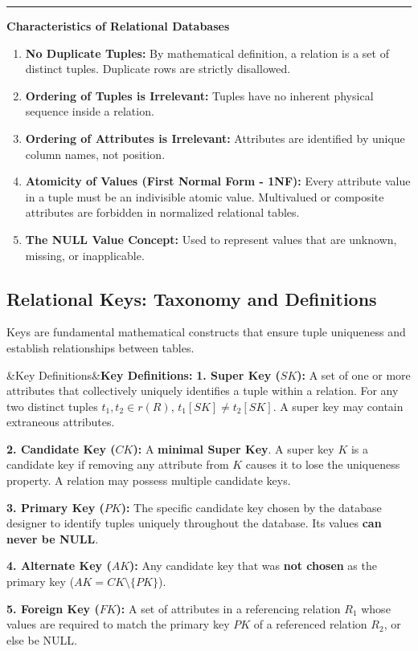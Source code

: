 \documentclass[11pt,a4paper]{article}
\newcommand{\concept}[1]{%
  \vspace{3pt}\noindent\textcolor{AnthGreen}{\rule{3.5pt}{10pt}}\enspace
  \textbf{\sffamily\color{AnthDark}#1}\par\vspace{2pt}%
}
\newenvironment{Def}[1][]{\begin{tcolorbox}[defbox]\ifx&#1&\else\textbf{\color{AnthOrange}#1:}\enspace\fi}{\end{tcolorbox}}
\begin{document}
\concept{Characteristics of Relational Databases}
\begin{enumerate}
  \item \textbf{No Duplicate Tuples:} By mathematical definition, a relation is a set of distinct tuples. Duplicate rows are strictly disallowed.
  \item \textbf{Ordering of Tuples is Irrelevant:} Tuples have no inherent physical sequence inside a relation.
  \item \textbf{Ordering of Attributes is Irrelevant:} Attributes are identified by unique column names, not position.
  \item \textbf{Atomicity of Values (First Normal Form - 1NF):} Every attribute value in a tuple must be an indivisible atomic value. Multivalued or composite attributes are forbidden in normalized relational tables.
  \item \textbf{The NULL Value Concept:} Used to represent values that are unknown, missing, or inapplicable.
\end{enumerate}

\subsection{Relational Keys: Taxonomy and Definitions}

Keys are fundamental mathematical constructs that ensure tuple uniqueness and establish relationships between tables.

\begin{Def}[Key Definitions]
\textbf{1. Super Key ($SK$):}
A set of one or more attributes that collectively uniquely identifies a tuple within a relation. For any two distinct tuples $t_1, t_2 \in r(R)$, $t_1[SK] \neq t_2[SK]$. A super key may contain extraneous attributes.

\textbf{2. Candidate Key ($CK$):}
A \textbf{minimal Super Key}. A super key $K$ is a candidate key if removing any attribute from $K$ causes it to lose the uniqueness property. A relation may possess multiple candidate keys.

\textbf{3. Primary Key ($PK$):}
The specific candidate key chosen by the database designer to identify tuples uniquely throughout the database. Its values \textbf{can never be NULL}.

\textbf{4. Alternate Key ($AK$):}
Any candidate key that was \textbf{not chosen} as the primary key ($AK = CK \setminus \{PK\}$).

\textbf{5. Foreign Key ($FK$):}
A set of attributes in a referencing relation $R_1$ whose values are required to match the primary key $PK$ of a referenced relation $R_2$, or else be NULL.
\end{Def}
\end{document}
